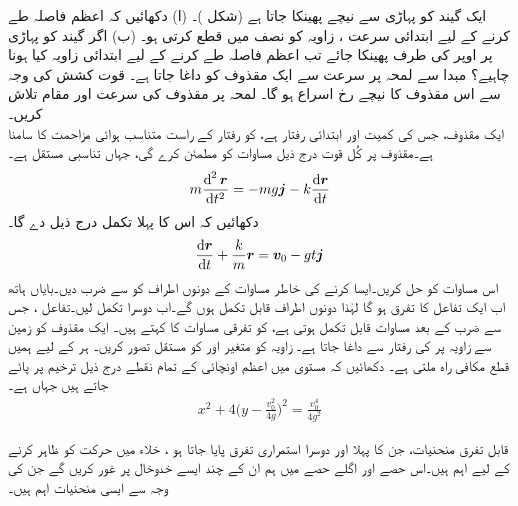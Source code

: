 ایک گیند کو پہاڑی  سے نیچے پھینکا جاتا ہے (شکل )۔ (ا)  دکھائیں کہ اعظم فاصلہ طے کرنے کے لیے ابتدائی  سرعت ، زاویہ  کو نصف میں قطع کرتی ہو۔ (ب) اگر گیند کو پہاڑی پر اوپر کی طرف  پھینکا جائے تب اعظم  فاصلہ طے کرنے کے لیے ابتدائی زاویہ کیا ہونا چاہیے؟ 
مبدا سے لمحہ  پر سرعت سے ایک  مقذوف کو داغا جاتا ہے۔ قوت کشش کی وجہ سے اس مقذوف  کا نیچے رخ اسراع   ہو گا۔ لمحہ  پر مقذوف کی سرعت  اور مقام تلاش کریں۔
\\
 ایک مقذوف،  جس کی کمیت  اور ابتدائی رفتار   ہے، کو   رفتار کے  راست متناسب ہوائی مزاحمت کا سامنا ہے۔مقذوف پر کُل قوت  درج ذیل مساوات کو مطمئن کرے گی،  جہاں  تناسبی  مستقل ہے۔
\begin{align*}
m\frac{\dif^{\,2}\kvec{r}}{\dif t^2}=-mg\aj-k\frac{\dif \kvec{r}}{\dif t}
\end{align*}
دکھائیں کہ اس کا پہلا تکمل درج ذیل دے گا۔
\begin{align*}
\frac{\dif \kvec{r}}{\dif t}+\frac{k}{m}\kvec{r}=\kvec{v}_0-gt\aj
\end{align*}
اس مساوات کو حل کریں۔ایسا کرنے کی خاطر مساوات کے دونوں اطراف کو  سے  ضرب دیں۔بایاں ہاتھ اب  ایک تفاعل کا تفرق ہو گا لہٰذا دونوں اطراف قابل تکمل ہوں گے۔اب دوسرا تکمل لیں۔تفاعل ، جس سے ضرب کے بعد مساوات قابل تکمل ہوتی ہے،  کو  تفرقی مساوات کا  کہتے ہیں۔
ایک مقذوف کو زمین سے  زاویہ  پر  کی  رفتار سے داغا جاتا ہے۔ زاویہ  کو متغیر اور  کو مستقل  تصور  کریں۔ ہر  کے لیے ہمیں قطع مکافی راہ ملتی  ہے۔ دکھائیں کہ مستوی میں اعظم اونچائی کے تمام نقطے درج ذیل  ترخیم پر پائے جاتے ہیں  جہاں  ہے۔
\begin{align*}
x^2+4\big(y-\frac{v_0^2}{4g}\big)^2=\frac{v_0^4}{4g^2}
\end{align*}


قابل تفرق منحنیات، جن کا   پہلا اور دوسرا استمراری تفرق پایا جاتا ہو ، خلاء  میں حرکت کو ظاہر کرنے  کے لیے  اہم  ہیں۔اس حصے اور اگلے حصے  میں ہم ان کے چند  ایسے   خدوخال پر غور کریں گے جن کی وجہ سے ایسی منحنیات  اہم ہیں۔  

